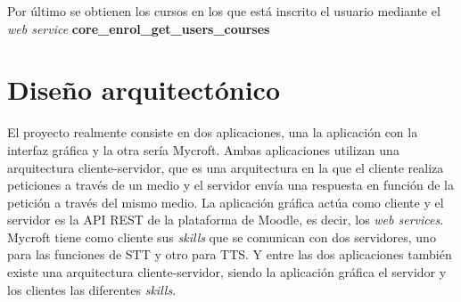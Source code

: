 Por último se obtienen los cursos en los que está inscrito el usuario mediante el \textit{web service} \textbf{core\_enrol\_get\_users\_courses}
\section{Diseño arquitectónico}

El proyecto realmente consiste en dos aplicaciones, una la aplicación con la interfaz gráfica y la otra sería Mycroft. Ambas aplicaciones utilizan una arquitectura cliente-servidor, que es una arquitectura en la que el cliente realiza peticiones a través de un medio y el servidor envía una respuesta en función de la petición a través del mismo medio. La aplicación gráfica actúa como cliente y el servidor es la API REST de la plataforma de Moodle, es decir, los \textit{web services}. Mycroft tiene como cliente sus \textit{skills} que se comunican con dos servidores, uno para las funciones de STT y otro para TTS. Y entre las dos aplicaciones también existe una arquitectura cliente-servidor, siendo la aplicación gráfica el servidor y los clientes las diferentes \textit{skills}.
